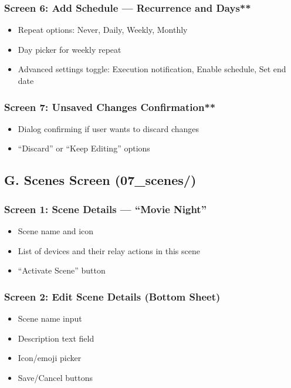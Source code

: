 \subsubsection{Screen 6: Add Schedule — Recurrence and Days**}
\begin{itemize}
    \item Repeat options: Never, Daily, Weekly, Monthly
    \item Day picker for weekly repeat
    \item Advanced settings toggle: Execution notification, Enable schedule, Set end date
\end{itemize}

\subsubsection{Screen 7: Unsaved Changes Confirmation**}
\begin{itemize}
    \item Dialog confirming if user wants to discard changes
    \item ``Discard'' or ``Keep Editing'' options
\end{itemize}

\subsection{G. Scenes Screen (07\_scenes/)}

\subsubsection{Screen 1: Scene Details — ``Movie Night''}
\begin{itemize}
    \item Scene name and icon
    \item List of devices and their relay actions in this scene
    \item ``Activate Scene'' button
\end{itemize}

\subsubsection{Screen 2: Edit Scene Details (Bottom Sheet)}
\begin{itemize}
    \item Scene name input
    \item Description text field
    \item Icon/emoji picker
    \item Save/Cancel buttons
\end{itemize}


